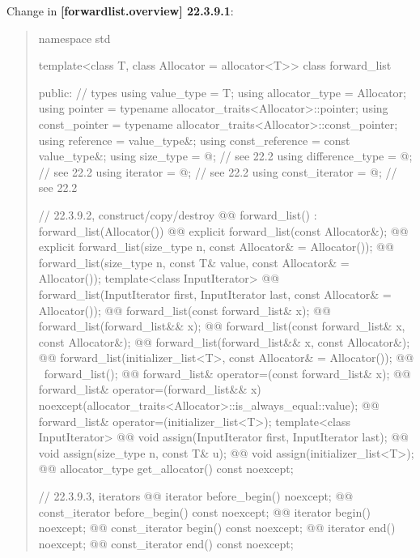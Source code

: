 \documentclass{wg21}
\begin{document}
Change in \textbf{[forwardlist.overview] 22.3.9.1}:
\begin{quote}
\begin{codeblock}
namespace std {
  template<class T, class Allocator = allocator<T>>
  class forward_list {
  public:
    // types
    using value_type             = T;
    using allocator_type         = Allocator;
    using pointer                = typename allocator_traits<Allocator>::pointer;
    using const_pointer          = typename allocator_traits<Allocator>::const_pointer;
    using reference              = value_type&;
    using const_reference        = const value_type&;
    using size_type              = @\impdef@; // see 22.2
    using difference_type        = @\impdef@; // see 22.2
    using iterator               = @\impdef@; // see 22.2
    using const_iterator         = @\impdef@; // see 22.2

    // 22.3.9.2, construct/copy/destroy
    @@ forward_list() : forward_list(Allocator()) { }
    @@ explicit forward_list(const Allocator&);
    @@ explicit forward_list(size_type n, const Allocator& = Allocator());
    @@ forward_list(size_type n, const T& value, const Allocator& = Allocator());
    template<class InputIterator>
      @@ forward_list(InputIterator first, InputIterator last, const Allocator& = Allocator());
    @@ forward_list(const forward_list& x);
    @@ forward_list(forward_list&& x);
    @@ forward_list(const forward_list& x, const Allocator&);
    @@ forward_list(forward_list&& x, const Allocator&);
    @@ forward_list(initializer_list<T>, const Allocator& = Allocator());
    @@ ~forward_list();
    @@ forward_list& operator=(const forward_list& x);
    @@ forward_list& operator=(forward_list&& x)
      noexcept(allocator_traits<Allocator>::is_always_equal::value);
    @@ forward_list& operator=(initializer_list<T>);
    template<class InputIterator>
      @@ void assign(InputIterator first, InputIterator last);
    @@ void assign(size_type n, const T& u);
    @@ void assign(initializer_list<T>);
    @@ allocator_type get_allocator() const noexcept;

    // 22.3.9.3, iterators
    @@ iterator               before_begin() noexcept;
    @@ const_iterator         before_begin() const noexcept;
    @@ iterator               begin() noexcept;
    @@ const_iterator         begin() const noexcept;
    @@ iterator               end() noexcept;
    @@ const_iterator         end() const noexcept;

}}
\end{codeblock}
\end{quote}
\end{document}
